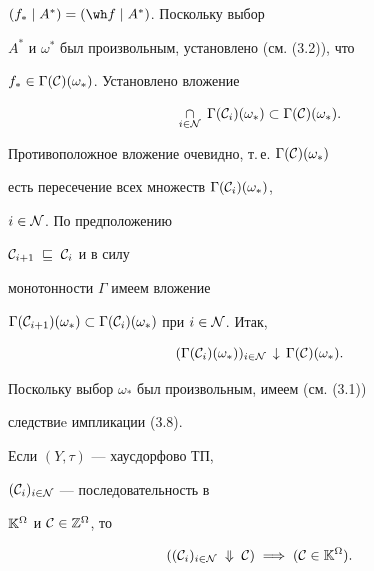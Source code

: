 \begin{pf}
$({f_*} \mid {A^*}) = ({\wh f} \mid {A^*})$. Поскольку выбор


$A^*$ и ${\omega}^*$ был произвольным, установлено (см. (3.2)), что


${f_*} \in {{\Gamma}({\cal C})({\omega}_*)}$. Установлено вложение


$$


\mathop{\cap}\limits_{i \in {\cal N}}\;


{{\Gamma}({\cal C}_i)({\omega}_*)} \subset


{{\Gamma}({\cal C})({\omega}_*)}.


$$


Противоположное вложение очевидно, т.\,е. ${\Gamma}({\cal C})({\omega}_*)$


есть пересечение всех множеств ${\Gamma}({\cal C}_i)({\omega}_*)$,


$i \in {\cal N}$. По предположению


${{\cal C}_{i+1}}\;\sqsubseteq\;{{\cal C}_i}$ и в силу


монотонности $\Gamma$ имеем вложение


${{\Gamma}({{\cal C}_{i+1}})({\omega}_*)} \subset


{{\Gamma}({{\cal C}_i})({\omega}_*)}$ при $i \in {\cal N}$. Итак,


$$


({\Gamma}({\cal C}_i)({\omega}_*))_{i \in {\cal N}}\,\downarrow\,


{\Gamma}({\cal C})({\omega}_*).


$$


Поскольку выбор ${\omega}_*$ был произвольным, имеем (см. (3.1))


следствиe импликации (3.8).


\end{pf}





Если $(Y,\tau)$ --- хаусдорфово ТП,


$({\cal C}_i)_{i \in {\cal N}}$ --- последовательность в


${\Bbb K}^{\Omega}$ и ${\cal C} \in {{\Bbb Z}^{\Omega}}$, то


$$


(({\cal C}_i)_{i \in {\cal N}}\;\Downarrow\;{\cal C})\;\Longrightarrow\;


({\cal C} \in {{\Bbb K}^{\Omega}}).


$$





